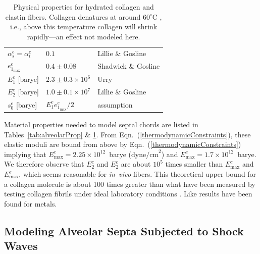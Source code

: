 \begin{table}
\begin{tabular}{|l|l|l|}
        $\alpha^e_s = \alpha^e_t$ & $0.1$ & 
        Lillie \& Gosline \cite{LillieGosline02a} \\ 
        $e^e_{1_{\max}}$ & $0.4 \pm 0.08$ & Shadwick \& Gosline \cite{ShadwickGosline85} \\
        $E^e_1$ \hfill [barye] & $2.3 \pm 0.3 \times 10^6$ & Urry \cite[Fig.~18]{Urry89} \\ 
        $E^e_2$ \hfill [barye] & $1.0 \pm 0.1 \times 10^7$ & 
        Lillie \& Gosline \cite[Fig.~5]{LillieGosline07} \\
        $s^e_0$ \hfill [barye] & $E^e_1 e^e_{1_{\max}} / 2$ & assumption \\
        \hline
    \end{tabular}
    \caption{Physical properties for hydrated collagen and elastin fibers.  Collagen denatures at around $60^\circ$C \cite{HoermannSchlebusch71}, i.e., above this temperature collagen will shrink rapidly---an effect not modeled here.}
    \label{tableCollagenElastin}
\end{table}

Material properties needed to model septal chords are listed in Tables~\ref{tab:alveolarProp} \& \ref{tableCollagenElastin}.  From Eqn.~(\ref{thermodynamicConstraints}), these elastic moduli are bound from above by Eqn.~(\ref{thermodynamicConstraints}) implying that $E^c_{\max} = 2.25 \times 10^{12}$~barye ($\text{dyne/cm}^2$) and $E^e_{\max} = 1.7 \times 10^{12}$~barye.  We therefore observe that $E^c_2$ and $E^e_2$ are about $10^5$ times smaller than $E^c_{\max}$ and $E^e_{\max}$, which seems reasonable for \textit{in~vivo\/} fibers.  This theoretical upper bound for a collagen molecule is about 100 times greater than what have been measured by testing collagen fibrils under ideal laboratory conditions \cite{Svenssonetal10}.  Like results have been found for metals.

\subsection{Modeling Alveolar Septa Subjected to Shock Waves}
\label{secConjugatePairs}


